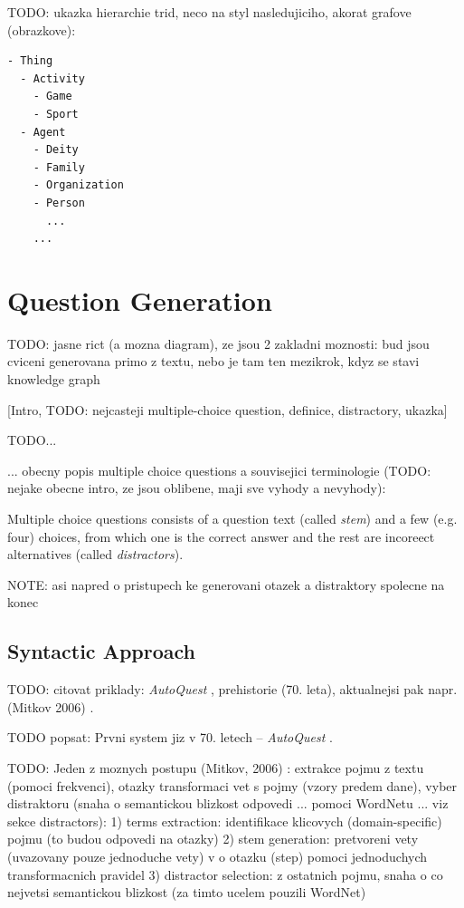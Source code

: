\documentclass[a4paper, 12pt, twoside]{fithesis2}		%
\renewcommand{\_}{\leavevmode \kern0.0em\vbox{\hrule width0.4em}}
\newcounter{choice}
\begin{document}
TODO: ukazka hierarchie trid, neco na styl nasledujiciho, akorat grafove (obrazkove):

\begin{verbatim}
- Thing
  - Activity
    - Game
    - Sport
  - Agent
    - Deity
    - Family
    - Organization
    - Person
      ...
    ...
\end{verbatim}

\chapter{Question Generation}
\label{chap:exercises}

TODO: jasne rict (a mozna diagram), ze jsou 2 zakladni moznosti: bud jsou cviceni generovana primo z textu, nebo je tam ten mezikrok, kdyz se stavi knowledge graph

[Intro, TODO: nejcasteji multiple-choice question, definice, distractory, ukazka]

TODO...

... obecny popis multiple choice questions a souvisejici terminologie (TODO: nejake obecne intro, ze jsou oblibene, maji sve vyhody a nevyhody):

Multiple choice questions consists of a question text (called \textit{stem})
and a few (e.g. four) choices, from which one is the correct answer
and the rest are incoreect alternatives (called \textit{distractors}).

NOTE: asi napred o pristupech ke generovani otazek a distraktory spolecne na konec


\section{Syntactic Approach}
\label{sec:questions-syntactically}

TODO: citovat priklady: \textit{AutoQuest} \cite{questions-wolfe}, prehistorie (70. leta), aktualnejsi pak napr. (Mitkov 2006) \cite{question-gen-mitkov}.

TODO popsat: Prvni system jiz v 70. letech -- \textit{AutoQuest} \cite{questions-wolfe}.

TODO: Jeden z moznych postupu (Mitkov, 2006) \cite{question-gen-mitkov}:
extrakce pojmu z textu (pomoci frekvenci), otazky transformaci vet s pojmy (vzory predem dane), vyber distraktoru (snaha o semantickou blizkost odpovedi ... pomoci WordNetu ... viz sekce distractors):
1) terms extraction: identifikace klicovych (domain-specific) pojmu (to budou odpovedi na otazky)
2) stem generation: pretvoreni vety (uvazovany pouze jednoduche vety) v o otazku (step) pomoci jednoduchych transformacnich pravidel
3) distractor selection: z ostatnich pojmu, snaha o co nejvetsi semantickou blizkost (za timto ucelem pouzili WordNet)
\end{document}

